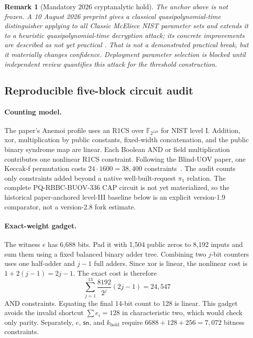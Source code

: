 \documentclass[11pt]{article}
\newtheorem{remark}[definition]{Remark}
\newcommand{\sn}{\mathsf{sn}}
\begin{document}
\begin{remark}[Mandatory 2026 cryptanalytic hold]\label{rem:mceliece-hold}
The anchor above is not frozen.  A 10 August 2026 preprint gives a classical
quasipolynomial-time distinguisher applying to all Classic McEliece NIST
parameter sets and extends it to a heuristic quasipolynomial-time decryption
attack; its concrete improvements are described as not yet practical
\cite{mceliece-2026-attack}.  That is not a demonstrated practical break, but it
materially changes confidence.  Deployment parameter selection is blocked
until independent review quantifies this attack for the threshold construction.
\end{remark}

\subsection{Reproducible five-block circuit audit}\label{sec:circuit-audit}

\paragraph{Counting model.}
The paper's Anemoi profile uses an R1CS over $\mathbb F_{2^{129}}$ for NIST
level I.  Addition, xor, multiplication by public constants, fixed-width
concatenation, and the public binary syndrome map are linear.  Each Boolean AND
or field multiplication contributes one nonlinear R1CS constraint.  Following
the Blind-UOV paper, one Keccak-f permutation costs
$24\cdot1600=38{,}400$ constraints~\cite{blind-uov}.  The audit counts only
constraints added beyond a native well-built-request $\pi_1$ relation.  The
complete PQ-RBBC-BUOV-336 CAP circuit is not yet materialized, so the
historical paper-anchored level-III baseline below is an explicit version-1.9
comparator, not a version-2.8 fork estimate.

\paragraph{Exact-weight gadget.}
The witness $e$ has 6,688 bits.  Pad it with 1,504 public zeros to 8,192 inputs
and sum them using a fixed balanced binary adder tree.  Combining two $j$-bit
counters uses one half-adder and $j-1$ full adders.  Since xor is linear, the
nonlinear cost is $1+2(j-1)=2j-1$.  The exact cost is therefore
\[
 \sum_{j=1}^{13}\frac{8192}{2^j}(2j-1)=24{,}547
\]
AND constraints.  Equating the final 14-bit count to 128 is linear.  This
gadget avoids the invalid shortcut $\sum e_i=128$ in characteristic two, which
would check only parity.  Separately, $e$, $\sn$, and $k_{\mathrm{hold}}$
require $6688+128+256=7{,}072$ bitness constraints.
\end{document}
